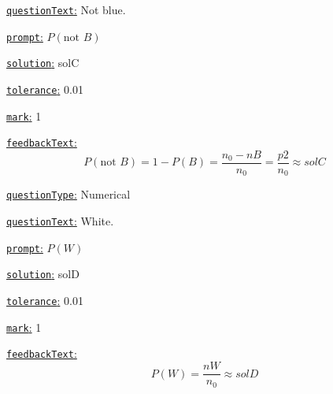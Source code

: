 \documentclass[preview]{standalone}
\newcommand \fieldname[1]{\underline{\texttt{#1}:}}
\begin{document}
\fieldname{questionText}
Not blue.

\fieldname{prompt}
$P(\textrm{not } B)$

\fieldname{solution}
solC

\fieldname{tolerance}
0.01

\fieldname{mark}
1

\fieldname{feedbackText}
\[
P(\textrm{not } B) = 1 - P(B) = \frac{{n_0} - {nB}}{{n_0}} = \frac{{p2}}{{n_0}} \approx {solC}
\]

\fieldname{questionType}
Numerical

\fieldname{questionText}
White.

\fieldname{prompt}
$P(W)$

\fieldname{solution}
solD

\fieldname{tolerance}
0.01

\fieldname{mark}
1

\fieldname{feedbackText}
\[
P(W) = \frac{nW}{n_0} \approx {solD}
\]

\end{document}
